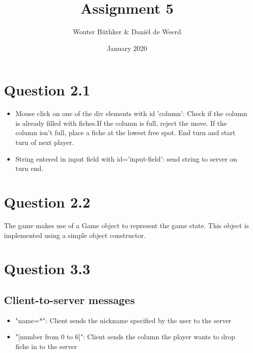 \documentclass{article}
\title{Assignment 5}
\author{Wouter Büthker & Daniël de Weerd}
\date{January 2020}
\begin{document}
    \maketitle

    \section{Question 2.1}\label{sec:question-2.1}
    \begin{itemize}
        \item Mouse click on one of the div elements with id 'column': Check if the column is already filled with fiches.If the column is full, reject the move. If the column isn't full, place a fiche at the lowest free spot. End turn and start turn of next player.
        \item String entered in input field with id='input-field': send string to server on turn end.
    \end{itemize}
    \section{Question 2.2}\label{sec:question-2.2}
    The game makes use of a Game object to represent the game state.
    This object is implemented using a simple object constructor.


    \section{Question 3.3}\label{sec:question-3.3}
    \subsection{Client-to-server messages}
    \begin{itemize}
        \item "name=*": Client sends the nickname specified by the user to the server
        \item "[number from 0 to 6]": Client sends the column the player wants to drop fiche in to the server
    \end{itemize}
\end{document}
